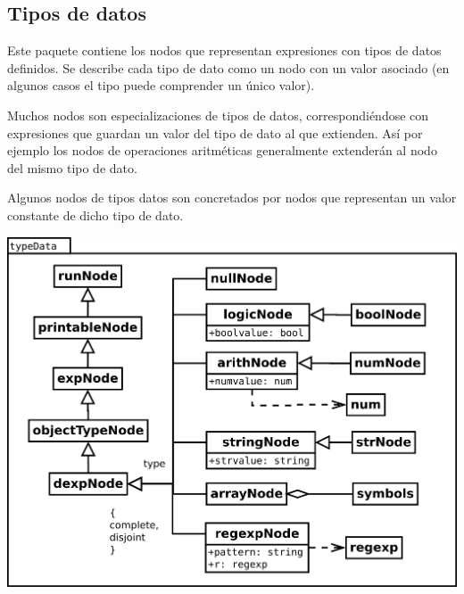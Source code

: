 \subsection{Tipos de datos}
Este paquete contiene los nodos que representan expresiones con tipos de datos definidos.
Se describe cada tipo de dato como un nodo con un valor asociado (en algunos casos el tipo puede comprender un único valor).

Muchos nodos son especializaciones de tipos de datos, correspondiéndose con expresiones que 
guardan un valor del tipo de dato al que extienden. Así por ejemplo los nodos de operaciones aritméticas
generalmente extenderán al nodo del mismo tipo de dato. 

Algunos nodos de tipos datos son concretados por nodos que representan un valor constante de dicho tipo de dato.
 
\begin{center}
\includegraphics[scale=0.4]{typeData.png} \\
\end{center}
\pagebreak
